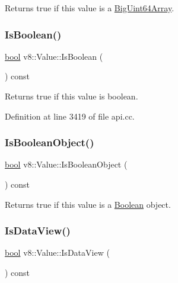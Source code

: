 Returns true if this value is a \mbox{\hyperlink{classv8_1_1BigUint64Array}{Big\+Uint64\+Array}}. \mbox{\label{classv8_1_1Value_a7ab7130b87a1fbcced76268353fae00b}} 
\subsubsection{\texorpdfstring{Is\+Boolean()}{IsBoolean()}}
{\footnotesize\ttfamily \mbox{\hyperlink{classbool}{bool}} v8\+::\+Value\+::\+Is\+Boolean (\begin{DoxyParamCaption}{ }\end{DoxyParamCaption}) const}

Returns true if this value is boolean. 

Definition at line 3419 of file api.\+cc.

\mbox{\label{classv8_1_1Value_a4cc64a2761fa8ed852007a2c35ecde8a}} 
\subsubsection{\texorpdfstring{Is\+Boolean\+Object()}{IsBooleanObject()}}
{\footnotesize\ttfamily \mbox{\hyperlink{classbool}{bool}} v8\+::\+Value\+::\+Is\+Boolean\+Object (\begin{DoxyParamCaption}{ }\end{DoxyParamCaption}) const}

Returns true if this value is a \mbox{\hyperlink{classv8_1_1Boolean}{Boolean}} object. \mbox{\label{classv8_1_1Value_ad854ff95b445e924a4d78b1b1dc8054b}} 
\subsubsection{\texorpdfstring{Is\+Data\+View()}{IsDataView()}}
{\footnotesize\ttfamily \mbox{\hyperlink{classbool}{bool}} v8\+::\+Value\+::\+Is\+Data\+View (\begin{DoxyParamCaption}{ }\end{DoxyParamCaption}) const}

